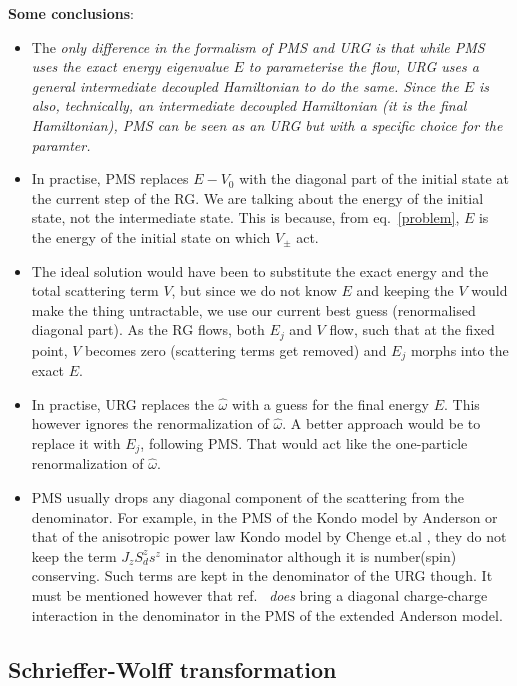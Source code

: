 \documentclass[12pt,twoside]{article}
\numberwithin{equation}{section}
\begin{document}
\pb \textbf{Some conclusions}:
\begin{itemize}
\item The \it{only} difference in the formalism of PMS and URG is that while PMS uses the exact energy eigenvalue \(E\) to parameterise the flow, URG uses a general intermediate decoupled Hamiltonian to do the same. Since the \(E\) is also, technically, an intermediate decoupled Hamiltonian (it is the final Hamiltonian), PMS can be seen as an URG but with a specific choice for the paramter.
\item In practise, PMS replaces \(E-V_0\) with the diagonal part of the initial state at the current step of the RG. We are talking about the energy of the initial state, not the intermediate state. This is because, from eq.~\ref{problem}, \(E\) is the energy of the initial state on which \(V_\pm\) act. 
\item The ideal solution would have been to substitute the exact energy and the total scattering term \(V\), but since we do not know \(E\) and keeping the \(V\) would make the thing untractable, we use our current best guess (renormalised diagonal part). As the RG flows, both \(E_j\) and \(V\) flow, such that at the fixed point, \(V\) becomes zero (scattering terms get removed) and \(E_j\) morphs into the exact \(E\). 
\item In practise, URG replaces the \(\hat \omega\) with a guess for the final energy \(E\). This however ignores the renormalization of \(\hat \omega\). A better approach would be to replace it with \(E_j\), following PMS. That would act like the one-particle renormalization of \(\hat \omega\).
\item PMS usually drops any diagonal component of the scattering from the denominator. For example, in the PMS of the Kondo model by Anderson \cite{Anderson} or that of the anisotropic power law Kondo model by Chenge et.al \cite{tatha}, they do not keep the term \(J_z S_d^z s^z\) in the denominator although it is number(spin) conserving. Such terms are kept in the denominator of the URG though. It must be mentioned however that ref.~\cite{raja} \textit{does} bring a diagonal charge-charge interaction in the denominator in the PMS of the extended Anderson model.
\end{itemize}
\subsection{Schrieffer-Wolff transformation}
\end{document}
